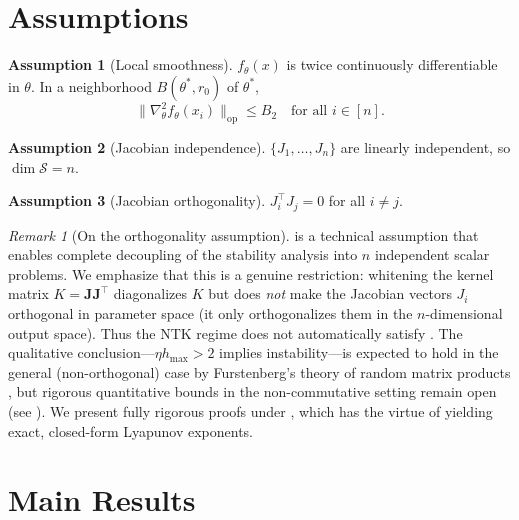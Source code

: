 \documentclass[11pt,a4paper]{article}
\theoremstyle{definition}
\newtheorem{assumption}{Assumption}
\theoremstyle{remark}
\newtheorem{remark}[theorem]{Remark}
\newcommand{\cS}{\mathcal{S}}
\newcommand{\bJ}{\mathbf{J}}
\begin{document}
\section{Assumptions}\label{sec:assumptions}

\begin{assumption}[Local smoothness]\label{A:smooth}
  $f_\theta(x)$ is twice continuously differentiable in $\theta$.  In a neighborhood
  $B(\theta^*, r_0)$ of $\theta^*$,
  \[
    \|\nabla^2_\theta f_\theta(x_i)\|_{\mathrm{op}} \leq B_2
    \quad \text{for all } i \in [n].
  \]
\end{assumption}

\begin{assumption}[Jacobian independence]\label{A:indep}
  $\{J_1, \ldots, J_n\}$ are linearly independent, so $\dim \cS = n$.
\end{assumption}

\begin{assumption}[Jacobian orthogonality]\label{A:orth}
  $J_i^\top J_j = 0$ for all $i \neq j$.
\end{assumption}

\begin{remark}[On the orthogonality assumption]\label{rem:orth}
   is a technical assumption that enables complete decoupling of the
  stability analysis into $n$ independent scalar problems.  We emphasize that this
  is a genuine restriction: whitening the kernel matrix $K = \bJ\bJ^\top$
  diagonalizes $K$ but does \emph{not} make the Jacobian vectors $J_i$ orthogonal
  in parameter space (it only orthogonalizes them in the $n$-dimensional output
  space).  Thus the NTK regime does not automatically satisfy .
  The qualitative conclusion---$\eta h_{\max} > 2$ implies instability---is
  expected to hold in the general (non-orthogonal) case by Furstenberg's theory
  of random matrix products \cite{furstenberg1960products}, but rigorous
  quantitative bounds in the non-commutative setting remain open
  (see ).  We present fully rigorous proofs under
  , which has the virtue of yielding exact, closed-form Lyapunov
  exponents.
\end{remark}

\section{Main Results}\label{sec:main}
\end{document}
